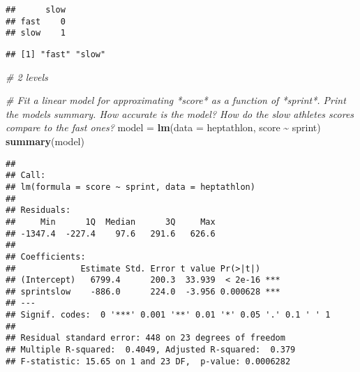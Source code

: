 \documentclass[
]{article}
\newenvironment{Shaded}{\begin{snugshade}}{\end{snugshade}}
\newcommand{\AttributeTok}[1]{\textcolor[rgb]{0.13,0.29,0.53}{#1}}
\newcommand{\CommentTok}[1]{\textcolor[rgb]{0.56,0.35,0.01}{\textit{#1}}}
\newcommand{\FunctionTok}[1]{\textcolor[rgb]{0.13,0.29,0.53}{\textbf{#1}}}
\newcommand{\NormalTok}[1]{#1}
\newcommand{\OtherTok}[1]{\textcolor[rgb]{0.56,0.35,0.01}{#1}}
\newcommand{\SpecialCharTok}[1]{\textcolor[rgb]{0.81,0.36,0.00}{\textbf{#1}}}
\begin{document}
\begin{Shaded}
\end{Shaded}

\begin{verbatim}
##      slow
## fast    0
## slow    1
\end{verbatim}

\begin{Shaded}
\end{Shaded}

\begin{verbatim}
## [1] "fast" "slow"
\end{verbatim}

\begin{Shaded}
\begin{Highlighting}[]
\CommentTok{\# 2 levels}
\end{Highlighting}
\end{Shaded}

\begin{Shaded}
\begin{Highlighting}[]
\CommentTok{\# Fit a linear model for approximating *score* as a function of *sprint*. Print the model\textquotesingle{}s summary. How accurate is the model? How do the slow athletes\textquotesingle{} scores compare to the fast ones?}
\NormalTok{model }\OtherTok{=} \FunctionTok{lm}\NormalTok{(}\AttributeTok{data =}\NormalTok{ heptathlon, score }\SpecialCharTok{\textasciitilde{}}\NormalTok{ sprint)}
\FunctionTok{summary}\NormalTok{(model)}
\end{Highlighting}
\end{Shaded}

\begin{verbatim}
## 
## Call:
## lm(formula = score ~ sprint, data = heptathlon)
## 
## Residuals:
##     Min      1Q  Median      3Q     Max 
## -1347.4  -227.4    97.6   291.6   626.6 
## 
## Coefficients:
##             Estimate Std. Error t value Pr(>|t|)    
## (Intercept)   6799.4      200.3  33.939  < 2e-16 ***
## sprintslow    -886.0      224.0  -3.956 0.000628 ***
## ---
## Signif. codes:  0 '***' 0.001 '**' 0.01 '*' 0.05 '.' 0.1 ' ' 1
## 
## Residual standard error: 448 on 23 degrees of freedom
## Multiple R-squared:  0.4049, Adjusted R-squared:  0.379 
## F-statistic: 15.65 on 1 and 23 DF,  p-value: 0.0006282
\end{verbatim}
\end{document}
